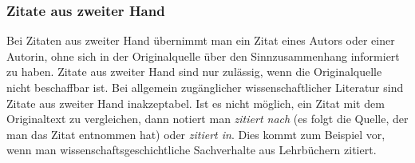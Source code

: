 \documentclass[a4paper,11pt]{article}%
\renewcommand{\\}{\vspace*{0.5\baselineskip} \newline}
\begin{document}
\subsubsection{Zitate aus zweiter Hand}
Bei Zitaten aus zweiter Hand übernimmt man ein Zitat eines Autors oder einer Autorin, ohne sich in der Originalquelle über den Sinnzusammenhang informiert zu haben. Zitate aus zweiter Hand sind nur zulässig, wenn die Originalquelle nicht beschaffbar ist. Bei allgemein zugänglicher wissenschaftlicher Literatur sind Zitate aus zweiter Hand inakzeptabel. Ist es nicht möglich, ein Zitat mit dem Originaltext zu vergleichen, dann notiert man \textit{zitiert nach} (es folgt die Quelle, der man das Zitat entnommen hat) oder \textit{zitiert in}. Dies kommt zum Beispiel vor, wenn man wissenschaftsgeschichtliche Sachverhalte aus Lehrbüchern zitiert.
\end{document}
